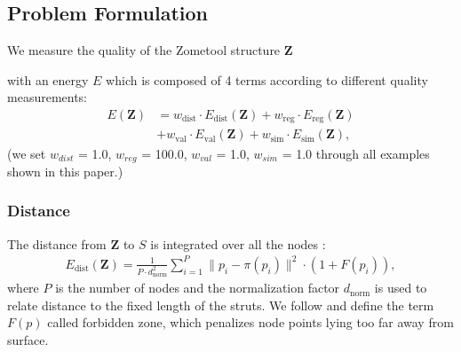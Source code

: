 


\subsection{Problem Formulation}
We measure the quality of the Zometool structure $\mathbf{Z}$ with an energy $E$ which is composed of 4 terms according to different quality measurements:
\begin{align}
\label{eq:sa_energy}
E(\mathbf{Z})&=w_{\text{dist}}\cdot E_{\text{dist}}(\mathbf{Z}) + w_{\text{reg}} \cdot E_{\text{reg}}(\mathbf{Z}) \nonumber \\ 
&+ w_{\text{val}}\cdot E_{\text{val}}(\mathbf{Z}) + 
w_{\text{sim}} \cdot E_{\text{sim}}(\mathbf{Z}),
\end{align}
(we set $w_{{dist}}$ = 1.0, $w_{{reg}}$ = 100.0, $w_{{val}}$ = 1.0, $w_{{sim}}$ = 1.0 through all examples shown in this paper.)

\subsubsection{Distance}
The distance from $\mathbf{Z}$ to $S$ is integrated over all the nodes :
\begin{align}
E_{\text{dist}}(\mathbf{Z}) = \frac{1}{P\cdot d^2_{\text{norm}}} \sum_{i=1}^{P} \|p_i - \pi(p_i) \|^2 \cdot (1+F(p_i)),
\end{align}
where $P$ is the number of nodes and the normalization factor $d_{\text{norm}}$ is used to relate distance to the fixed length of the struts.
We follow \cite{zimmer:2014:Zometool} and define the term $F(p)$ called forbidden zone, which penalizes node points lying too far away from surface. 

